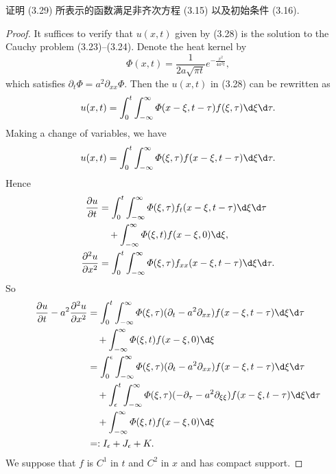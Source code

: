 \begin{exercise}[4]
  证明 (3.29) 所表示的函数满足非齐次方程 (3.15) 以及初始条件 (3.16).
\end{exercise}

\begin{proof}
  It suffices to verify that $u(x,t)$ given by (3.28) is the solution to
  the Cauchy problem (3.23)--(3.24). Denote the heat kernel by
  \[ \varPhi(x,t) = \frac{1}{2a\sqrt{\pi t}} e^{-\frac{x^2}{4a^2t}}, \]
  which satisfies $\partial_t\varPhi = a^2\partial_{xx}\varPhi$. Then
  the $u(x,t)$ in (3.28) can be rewritten as
  \begin{equation}\label{eq:d1}
    u(x,t) = \int_0^t\int_{-\infty}^\infty \varPhi(x-\xi, t-\tau) f(\xi,\tau) \d\xi\d\tau.
  \end{equation}
  Making a change of variables, we have
  \begin{equation}\label{eq:d2}
    u(x,t) = \int_0^t\int_{-\infty}^\infty \varPhi(\xi,\tau) f(x-\xi,t-\tau) \d\xi\d\tau.
  \end{equation}
  Hence
  \begin{align}
    \frac{\partial u}{\partial t}
    & = \int_0^t\int_{-\infty}^\infty \varPhi(\xi,\tau) f_t(x-\xi,t-\tau) \d\xi\d\tau \notag \\
    &   \quad + \int_{-\infty}^\infty \varPhi(\xi,t)f(x-\xi,0) \d\xi, \\
    \frac{\partial^2u}{\partial x^2}
    & = \int_0^t \int_{-\infty}^\infty \varPhi(\xi,\tau) f_{xx}(x-\xi,t-\tau) \d\xi\d\tau.
  \end{align}
  So
  \begin{align*}
    \frac{\partial u}{\partial t} - a^2\frac{\partial^2u}{\partial x^2}
    & = \int_0^t \int_{-\infty}^\infty \varPhi(\xi,\tau) (\partial_t - a^2\partial_{xx})
        f(x-\xi,t-\tau) \d\xi\d\tau \\
    &   \quad + \int_{-\infty}^\infty \varPhi(\xi,t) f(x-\xi,0) \d\xi \\
    & = \int_0^\epsilon \int_{-\infty}^\infty \varPhi(\xi,\tau) (\partial_t - a^2\partial_{xx})
        f(x-\xi,t-\tau) \d\xi\d\tau \\
    &   \quad + \int_\epsilon^t \int_{-\infty}^\infty \varPhi(\xi,\tau) (-\partial_\tau - a^2\partial_{\xi\xi})
        f(x-\xi,t-\tau) \d\xi\d\tau \\
    &   \quad + \int_{-\infty}^\infty \varPhi(\xi,t) f(x-\xi,0) \d\xi \\
    & =: I_\epsilon + J_\epsilon + K.
  \end{align*}
  We suppose that $f$ is $C^1$ in $t$ and $C^2$ in $x$ and has compact support.

\end{proof}
